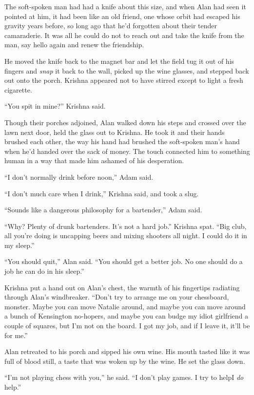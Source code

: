 The soft-spoken man had had a knife about this size, and when Alan had
seen it pointed at him, it had been like an old friend, one whose
orbit had escaped his gravity years before, so long ago that he'd
forgotten about their tender camaraderie.  It was all he could do not
to reach out and take the knife from the man, say hello again and
renew the friendship.

He moved the knife back to the magnet bar and let the field tug it out
of his fingers and \textit{snap} it back to the wall, picked up the
wine glasses, and stepped back out onto the porch.  Krishna appeared
not to have stirred except to light a fresh cigarette.

``You spit in mine?'' Krishna said.

Though their porches adjoined, Alan walked down his steps and crossed
over the lawn next door, held the glass out to Krishna.  He took it
and their hands brushed each other, the way his hand had brushed the
soft-spoken man's hand when he'd handed over the sack of money.  The
touch connected him to something human in a way that made him ashamed
of his desperation.

``I don't normally drink before noon,'' Adam said.

``I don't much care when I drink,'' Krishna said, and took a slug.

``Sounds like a dangerous philosophy for a bartender,'' Adam said.

``Why?  Plenty of drunk bartenders.  It's not a hard job.'' Krishna
spat.  ``Big club, all you're doing is uncapping beers and mixing
shooters all night.  I could do it in my sleep.''

``You should quit,'' Alan said.  ``You should get a better job.  No
one should do a job he can do in his sleep.''

Krishna put a hand out on Alan's chest, the warmth of his fingertips
radiating through Alan's windbreaker.  ``Don't try to arrange me on
your chessboard, monster.  Maybe you can move Natalie around, and
maybe you can move around a bunch of Kensington no-hopers, and maybe
you can budge my idiot girlfriend a couple of squares, but I'm not on
the board.  I got my job, and if I leave it, it'll be for me.''

Alan retreated to his porch and sipped his own wine.  His mouth tasted
like it was full of blood still, a taste that was woken up by the
wine.  He set the glass down.

``I'm not playing chess with you,'' he said.  ``I don't play games.  I
try to help\dash{}I \textit{do} help.''

